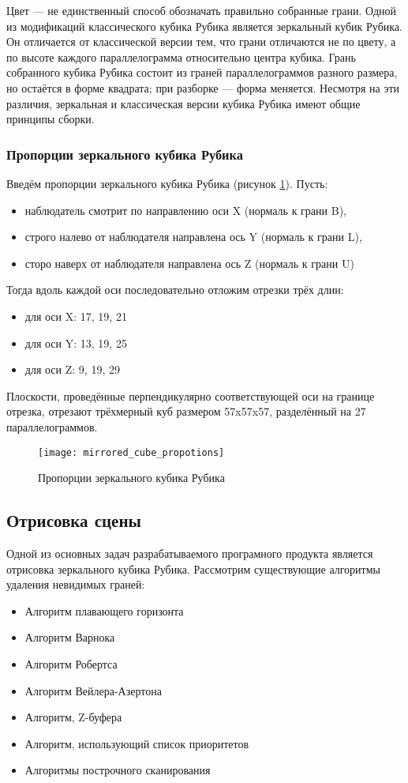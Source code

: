 Цвет --- не единственный способ обозначать правильно собранные грани. Одной из модификаций классического кубика Рубика является зеркальный кубик Рубика. Он отличается от классической версии тем, что грани отличаются не по цвету, а по высоте каждого параллелограмма относительно центра кубика. Грань собранного кубика Рубика состоит из граней параллелограммов разного размера, но остаётся в форме квадрата; при разборке --- форма меняется. Несмотря на эти различия, зеркальная и классическая версии кубика Рубика имеют общие принципы сборки.

\subsubsection{Пропорции зеркального кубика Рубика}
Введём пропорции зеркального кубика Рубика (рисунок \ref{fig:mirrored_cube_proportions}). Пусть:
\begin{itemize}
	\item наблюдатель смотрит по направлению оси X (нормаль к грани B),
	\item строго налево от наблюдателя направлена ось Y (нормаль к грани L),
	\item сторо наверх от наблюдателя направлена ось Z (нормаль к грани U)
\end{itemize}

Тогда вдоль каждой оси последовательно отложим отрезки трёх длин:
\begin{itemize}
	\item для оси X: 17, 19, 21
	\item для оси Y: 13, 19, 25
	\item для оси Z: 9, 19, 29
\end{itemize}

Плоскости, проведённые перпендикулярно соответствующей оси на границе отрезка, отрезают трёхмерный куб размером 57x57x57, разделённый на 27 параллелограммов. 

\begin{figure}[ht]
	\centering
	\texttt{[image: mirrored\_cube\_propotions]}
	\caption{Пропорции зеркального кубика Рубика}
	\label{fig:mirrored_cube_proportions}
\end{figure}

\subsection{Отрисовка сцены}
Одной из основных задач разрабатываемого програмного продукта является отрисовка зеркального кубика Рубика. Рассмотрим существующие алгоритмы удаления невидимых граней:
\begin{itemize}
	\item Алгоритм плавающего горизонта
	\item Алгоритм Варнока
	\item Алгоритм Робертса
	\item Алгоритм Вейлера-Азертона
	\item Алгоритм, Z-буфера
	\item Алгоритм, использующий список приоритетов
	\item Алгоритмы построчного сканирования
\end{itemize}

